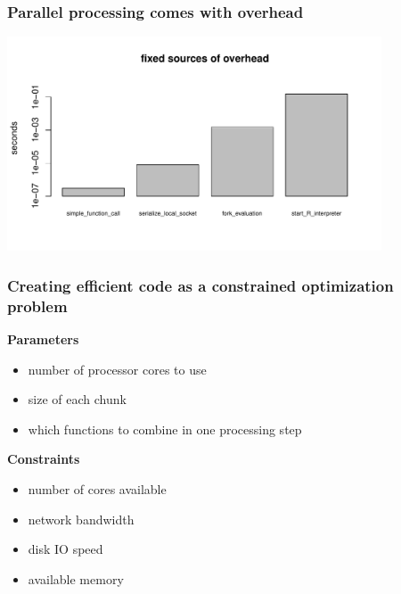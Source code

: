 \documentclass{beamer}
\begin{document}
\begin{frame}

\frametitle{Parallel processing comes with overhead}

    \centerline{\includegraphics[height=2.5in]{../compute_times/overhead}}



\end{frame}
\begin{frame}


    \frametitle{Creating efficient code as a constrained optimization
    problem}

\textbf{Parameters}
\begin{itemize}
    \item number of processor cores to use
    \item size of each chunk
    \item which functions to combine in one processing step
\end{itemize}

\textbf{Constraints}
\begin{itemize}
    \item number of cores available
    \item network bandwidth
    \item disk IO speed
    \item available memory
\end{itemize}

\end{frame}
\end{document}
